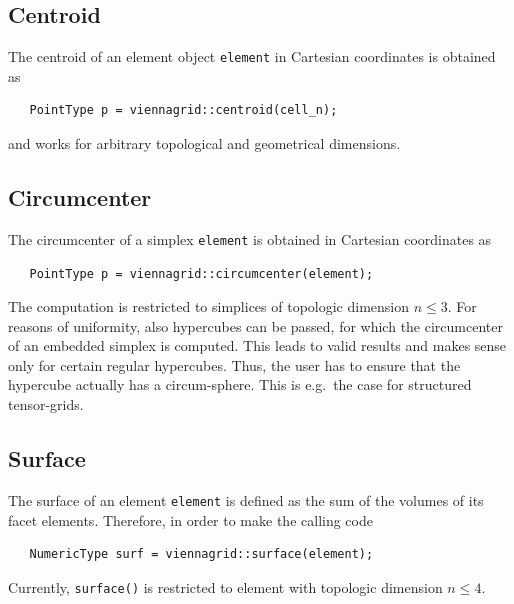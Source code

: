   \subsection{Centroid}
  The centroid of an element object \lstinline|element| in Cartesian coordinates is obtained as
  \begin{lstlisting}
   PointType p = viennagrid::centroid(cell_n);
  \end{lstlisting}
  and works for arbitrary topological and geometrical dimensions.

  \subsection{Circumcenter}
  The circumcenter of a simplex \lstinline|element| is obtained in Cartesian coordinates as
  \begin{lstlisting}
   PointType p = viennagrid::circumcenter(element);
  \end{lstlisting}
  The computation is restricted to simplices of topologic dimension $n \leq 3$. For reasons of uniformity, also hypercubes can be passed, for which the circumcenter of an embedded simplex is computed. This leads to valid results and makes sense only for certain regular hypercubes.
  Thus, the user has to ensure that the hypercube actually has a circum-sphere. This is e.g.~the case for structured tensor-grids.


  \subsection{Surface}
  The surface of an element \lstinline|element| is defined as the sum of the volumes of its facet elements. Therefore, in order to make the calling code
  \begin{lstlisting}
   NumericType surf = viennagrid::surface(element);
  \end{lstlisting}
  Currently, \lstinline|surface()| is restricted to element with topologic dimension $n \leq 4$.


